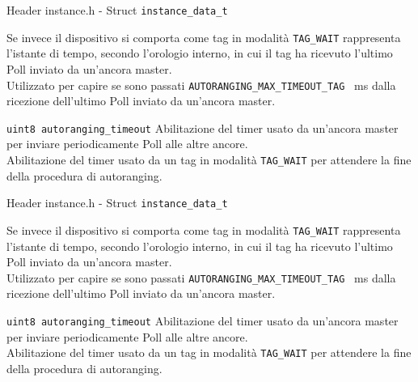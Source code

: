 \begin{frame}[fragile]{Header instance.h - Struct \lstinline!instance_data_t!}
  \begin{block}{}
    Se invece il dispositivo si comporta come tag in modalità \lstinline!TAG_WAIT! rappresenta l'istante di tempo, secondo l'orologio
    interno, in cui il tag ha ricevuto l'ultimo Poll inviato da un'ancora master.\\
    Utilizzato per capire se sono passati \lstinline!AUTORANGING_MAX_TIMEOUT_TAG! \SI{}{\milli\second} dalla ricezione
    dell'ultimo Poll inviato da un'ancora master.
  \end{block}
  \begin{block}{\lstinline!uint8 autoranging_timeout!}
    Abilitazione del timer usato da un'ancora master per inviare periodicamente Poll alle altre ancore.\\
    Abilitazione del timer usato da un tag in modalità \lstinline!TAG_WAIT! per attendere la fine della
    procedura di autoranging.
  \end{block}
\end{frame}

\begin{frame}[fragile]{Header instance.h - Struct \lstinline!instance_data_t!}
  \begin{block}{}
    Se invece il dispositivo si comporta come tag in modalità \lstinline!TAG_WAIT! rappresenta l'istante di tempo, secondo l'orologio
    interno, in cui il tag ha ricevuto l'ultimo Poll inviato da un'ancora master.\\
    Utilizzato per capire se sono passati \lstinline!AUTORANGING_MAX_TIMEOUT_TAG! \SI{}{\milli\second} dalla ricezione
    dell'ultimo Poll inviato da un'ancora master.
  \end{block}
  \begin{block}{\lstinline!uint8 autoranging_timeout!}
    Abilitazione del timer usato da un'ancora master per inviare periodicamente Poll alle altre ancore.\\
    Abilitazione del timer usato da un tag in modalità \lstinline!TAG_WAIT! per attendere la fine della
    procedura di autoranging.
  \end{block}
\end{frame}

